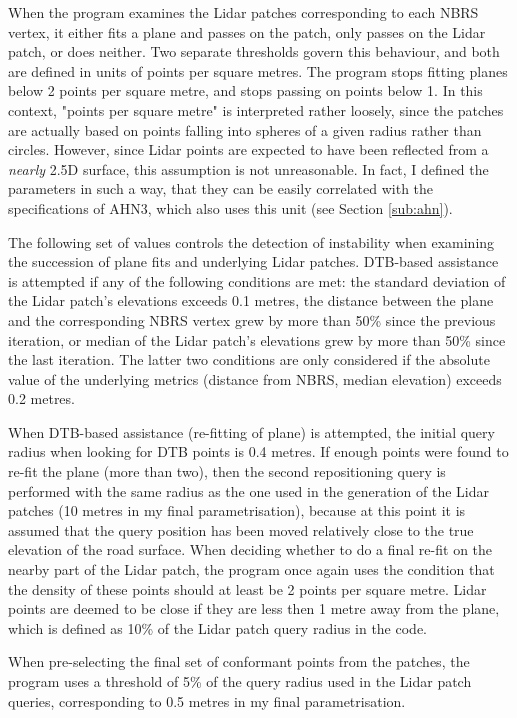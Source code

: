 When the program examines the Lidar patches corresponding to each NBRS vertex, it either fits a plane and passes on the patch, only passes on the Lidar patch, or does neither. Two separate thresholds govern this behaviour, and both are defined in units of points per square metres. The program stops fitting planes below 2 points per square metre, and stops passing on points below 1. In this context, "points per square metre" is interpreted rather loosely, since the patches are actually based on points falling into spheres of a given radius rather than circles. However, since Lidar points are expected to have been reflected from a \textit{nearly} 2.5D surface, this assumption is not unreasonable. In fact, I defined the parameters in such a way, that they can be easily correlated with the specifications of AHN3, which also uses this unit (see Section \ref{sub:ahn}).

The following set of values controls the detection of instability when examining the succession of plane fits and underlying Lidar patches. DTB-based assistance is attempted if any of the following conditions are met: the standard deviation of the Lidar patch's elevations exceeds 0.1 metres, the distance between the plane and the corresponding NBRS vertex grew by more than 50\% since the previous iteration, or median of the Lidar patch's elevations grew by more than 50\% since the last iteration. The latter two conditions are only considered if the absolute value of the underlying metrics (distance from NBRS, median elevation) exceeds 0.2 metres.

When DTB-based assistance (re-fitting of plane) is attempted, the initial query radius when looking for DTB points is 0.4 metres. If enough points were found to re-fit the plane (more than two), then the second repositioning query is performed with the same radius as the one used in the generation of the Lidar patches (10 metres in my final parametrisation), because at this point it is assumed that the query position has been moved relatively close to the true elevation of the road surface. When deciding whether to do a final re-fit on the nearby part of the Lidar patch, the program once again uses the condition that the density of these points should at least be 2 points per square metre. Lidar points are deemed to be close if they are less then 1 metre away from the plane, which is defined as 10\% of the Lidar patch query radius in the code.

When pre-selecting the final set of conformant points from the patches, the program uses a threshold of 5\% of the query radius used in the Lidar patch queries, corresponding to 0.5 metres in my final parametrisation.

